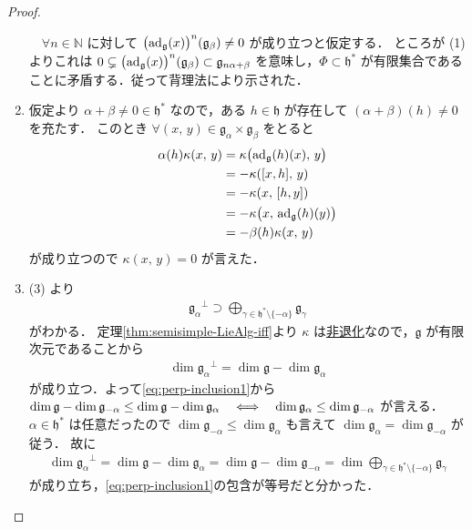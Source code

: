 \documentclass[rep_main]{subfiles}
\begin{document}
\begin{proof}
\begin{enumerate}
		　$\forall n \in \mathbb{N}$ に対して $\bigl(\operatorname{ad}_{\mathfrak{g}}(x)\bigr)^n (\mathfrak{g}_\beta) \neq 0$ が成り立つと仮定する．
		ところが (1) よりこれは
		$0 \subsetneq \bigl(\operatorname{ad}_{\mathfrak{g}}(x) \bigr)^n(\mathfrak{g}_\beta) \subset \mathfrak{g}_{n\alpha + \beta}$ を意味し，$\Phi \subset \mathfrak{h}^*$ が有限集合であることに矛盾する．従って背理法により示された．
		\item 仮定より $\alpha + \beta \neq 0 \in \mathfrak{h}^*$ なので，ある $h \in \mathfrak{h}$ が存在して $(\alpha + \beta)(h) \neq 0$ を充たす．
		このとき $\forall (x,\, y) \in \mathfrak{g}_\alpha \times \mathfrak{g}_{\beta}$ をとると
		\begin{align}
			\alpha(h) \kappa(x,\, y)
			&= \kappa\bigl(\ad_{\mathfrak{g}}(h)(x),\, y\bigr) \\
			&= -\kappa(\comm{x}{h},\, y) \\
			&= -\kappa(x,\, \comm{h}{y}) \\
			&= -\kappa\bigl(x,\, \ad_{\mathfrak{g}}(h)(y)\bigr) \\
			&= -\beta(h) \kappa(x,\, y)
		\end{align}
		が成り立つので $\kappa(x,\, y) = 0$ が言えた．
		\item (3) より
		\begin{align}
			\label{eq:perp-inclusion1}
			\mathfrak{g}_\alpha{}^\perp \supset \bigoplus_{\gamma \in \mathfrak{h}^* \setminus \{-\alpha\}} \mathfrak{g}_{\gamma}
		\end{align}
		がわかる．
		定理\ref{thm:semisimple-LieAlg-iff}より $\kappa$ は\hyperref[def:radical-bilinear]{非退化}なので，$\mathfrak{g}$ が有限次元であることから
		\begin{align}
			\dim \mathfrak{g}_\alpha{}^\perp = \dim \mathfrak{g} - \dim \mathfrak{g}_\alpha
		\end{align}
		が成り立つ．よって\eqref{eq:perp-inclusion1}から $\dim \mathfrak{g} - \dim \mathfrak{g}_{-\alpha} \le \dim \mathfrak{g} - \dim \mathfrak{g}_\alpha \quad \Longleftrightarrow \quad \dim \mathfrak{g}_\alpha \le \dim \mathfrak{g}_{-\alpha}$ が言える．$\alpha \in \mathfrak{h}^*$ は任意だったので $\dim \mathfrak{g}_{-\alpha} \le \dim \mathfrak{g}_{\alpha}$ も言えて $\dim \mathfrak{g}_\alpha = \dim \mathfrak{g}_{-\alpha}$ が従う．
		故に
		\begin{align}
			\dim \mathfrak{g}_\alpha{}^\perp = \dim \mathfrak{g} - \dim \mathfrak{g}_{\alpha} = \dim \mathfrak{g} - \dim \mathfrak{g}_{-\alpha} = \dim \bigoplus_{\gamma \in \mathfrak{h}^* \setminus \{-\alpha\}} \mathfrak{g}_{\gamma}
		\end{align}
		が成り立ち，\eqref{eq:perp-inclusion1}の包含が等号だと分かった．
	\end{enumerate}
	
\end{proof}
\end{document}
